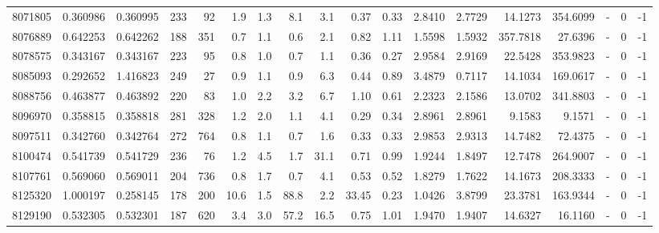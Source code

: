 \begin{tabular}{rrrrrrrrrrrrrrrlrr}
   8071805 & 0.360986 &   0.360995 &  233 &   92 &      1.9 &      1.3 &     8.1 &      3.1 &       0.37 &        0.33 &  2.8410 &  2.7729 &   14.1273 &  354.6099 &             - &        0 &         -1 \\
   8076889 & 0.642253 &   0.642262 &  188 &  351 &      0.7 &      1.1 &     0.6 &      2.1 &       0.82 &        1.11 &  1.5598 &  1.5932 &  357.7818 &   27.6396 &             - &        0 &         -1 \\
   8078575 & 0.343167 &   0.343167 &  223 &   95 &      0.8 &      1.0 &     0.7 &      1.1 &       0.36 &        0.27 &  2.9584 &  2.9169 &   22.5428 &  353.9823 &             - &        0 &         -1 \\
   8085093 & 0.292652 &   1.416823 &  249 &   27 &      0.9 &      1.1 &     0.9 &      6.3 &       0.44 &        0.89 &  3.4879 &  0.7117 &   14.1034 &  169.0617 &             - &        0 &         -1 \\
   8088756 & 0.463877 &   0.463892 &  220 &   83 &      1.0 &      2.2 &     3.2 &      6.7 &       1.10 &        0.61 &  2.2323 &  2.1586 &   13.0702 &  341.8803 &             - &        0 &         -1 \\
   8096970 & 0.358815 &   0.358818 &  281 &  328 &      1.2 &      2.0 &     1.1 &      4.1 &       0.29 &        0.34 &  2.8961 &  2.8961 &    9.1583 &    9.1571 &             - &        0 &         -1 \\
   8097511 & 0.342760 &   0.342764 &  272 &  764 &      0.8 &      1.1 &     0.7 &      1.6 &       0.33 &        0.33 &  2.9853 &  2.9313 &   14.7482 &   72.4375 &             - &        0 &         -1 \\
   8100474 & 0.541739 &   0.541729 &  236 &   76 &      1.2 &      4.5 &     1.7 &     31.1 &       0.71 &        0.99 &  1.9244 &  1.8497 &   12.7478 &  264.9007 &             - &        0 &         -1 \\
   8107761 & 0.569060 &   0.569011 &  204 &  736 &      0.8 &      1.7 &     0.7 &      4.1 &       0.53 &        0.52 &  1.8279 &  1.7622 &   14.1673 &  208.3333 &             - &        0 &         -1 \\
   8125320 & 1.000197 &   0.258145 &  178 &  200 &     10.6 &      1.5 &    88.8 &      2.2 &      33.45 &        0.23 &  1.0426 &  3.8799 &   23.3781 &  163.9344 &             - &        0 &         -1 \\
   8129190 & 0.532305 &   0.532301 &  187 &  620 &      3.4 &      3.0 &    57.2 &     16.5 &       0.75 &        1.01 &  1.9470 &  1.9407 &   14.6327 &   16.1160 &             - &        0 &         -1 \\

\end{tabular}
